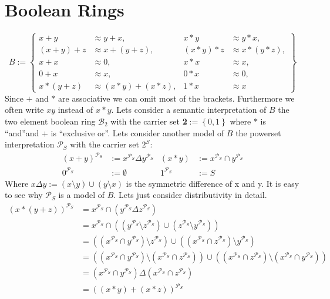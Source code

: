 \section{Boolean Rings}
\[B:=\left\lbrace 
\begin{aligned}
x+y&\approx y+x,& x*y&\approx y*x,\\
(x+y)+z&\approx x+(y+z),& (x*y)*z&\approx x*(y*z),\\
x+x&\approx 0,& x*x&\approx x,\\
0+x&\approx x,& 0*x&\approx 0,\\
x*(y+z)&\approx (x*y)+(x*z),& 1*x&\approx x
\end{aligned}
\right\rbrace \]
Since $+$ and $*$ are associative we can omit most of the brackets. Furthermore we often write $xy$ instead of $x*y$.
Lets consider a semantic interpretation of $B$ the two element boolean ring $\mathcal{B}_2$ with the carrier set \textbf{2}$:=\left\lbrace 0,1\right\rbrace$ where $*$ is \textquotedblleft and\textquotedblright and $+$ is \textquotedblleft exclusive or\textquotedblright. 
Lets consider another model of $B$ the powerset interpretation $\mathcal{P}_S$ with the carrier set $2^S$:
\begin{align*}
(x+y)^{\mathcal{P}_S}&:=x^{\mathcal{P}_S}\Delta y^{\mathcal{P}_S}& (x*y)&:=x^{\mathcal{P}_S}\cap y^{\mathcal{P}_S}\\
0^{\mathcal{P}_S}&:=\emptyset& 1^{\mathcal{P}_S}&:=S
\end{align*}
Where $x\Delta y:=(x\setminus y)\cup(y\setminus x)$ is the symmetric difference of x and y. It is easy to see why $\mathcal{P}_S$ is a model of $B$. Lets just consider distributivity in detail.
\begin{align*}
(x*(y+z))^{\mathcal{P}_S}&=x^{\mathcal{P}_S}\cap(y^{\mathcal{P}_S}\Delta z^{\mathcal{P}_S})\\
&=x^{\mathcal{P}_S}\cap((y^{\mathcal{P}_S}\setminus z^{\mathcal{P}_S})\cup(z^{\mathcal{P}_S}\setminus y^{\mathcal{P}_S}))\\
&=((x^{\mathcal{P}_S}\cap y^{\mathcal{P}_S})\setminus z^{\mathcal{P}_S})\cup((x^{\mathcal{P}_S}\cap z^{\mathcal{P}_S})\setminus y^{\mathcal{P}_S})\\
&=((x^{\mathcal{P}_S}\cap y^{\mathcal{P}_S})\setminus (x^{\mathcal{P}_S}\cap z^{\mathcal{P}_S}))\cup((x^{\mathcal{P}_S}\cap z^{\mathcal{P}_S})\setminus (x^{\mathcal{P}_S}\cap y^{\mathcal{P}_S}))\\
&=(x^{\mathcal{P}_S}\cap y^{\mathcal{P}_S})\Delta (x^{\mathcal{P}_S}\cap z^{\mathcal{P}_S})\\
&=((x*y)+(x*z))^{\mathcal{P}_S}
\end{align*}
